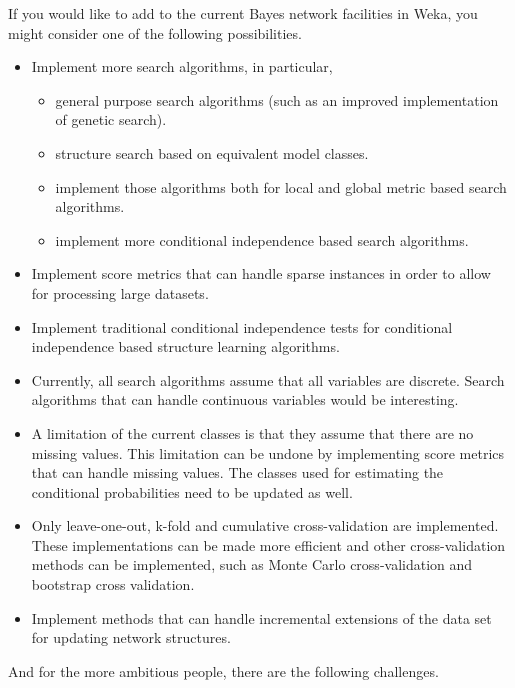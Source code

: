 If you would like to add to the current Bayes network facilities in Weka, you might
consider one of the following possibilities.

\begin{itemize}
\item Implement more search algorithms, in particular, 
\begin{itemize}
\item general purpose search algorithms (such as an improved implementation of 
genetic search).
\item structure search based on equivalent model classes.
\item implement those algorithms both for local and global metric based search algorithms.
\item implement more conditional independence based search algorithms.
\end{itemize}

\item Implement score metrics that can handle sparse instances in order to allow 
for processing large datasets.

\item Implement traditional conditional independence tests for conditional
independence based structure learning algorithms.

\item Currently, all search algorithms assume that all variables are discrete.
Search algorithms that can handle continuous variables would be interesting.

\item A limitation of the current classes is that they assume that there
are no missing values. This limitation can be undone by implementing score metrics 
that can handle missing values.
The classes used for estimating the conditional probabilities need to be updated
as well.

\item Only leave-one-out, k-fold and cumulative cross-validation are implemented.
These implementations can be made more efficient and other cross-validation methods
can be implemented, such as Monte Carlo cross-validation and bootstrap cross
validation.

\item Implement methods that can handle incremental extensions of the data set for
updating network structures.

\end{itemize}

And for the more ambitious people, there are the following challenges.

